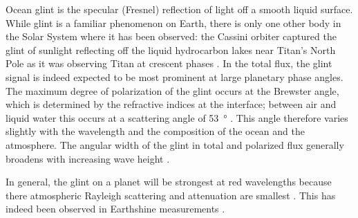 \documentclass[usenatbib]{mnras}
\begin{document}
Ocean glint is the specular (Fresnel) reflection of light off a smooth liquid surface. 
While glint is a familiar phenomenon on Earth, there is only one other body in the Solar System where it has been observed: the Cassini orbiter captured the glint of sunlight reflecting off the liquid hydrocarbon lakes near Titan's North Pole as it was observing %
Titan at crescent phases \citep{2010GeoRL..37.7104S}.
In the total flux, the glint signal is indeed expected to be most prominent at large planetary phase angles.
The maximum degree of polarization of the glint occurs at the Brewster angle, which is determined by the refractive indices at the interface; between air and liquid water this occurs at a scattering angle of \qty{53}{\degree} \citep[i.e., at a planetary phase angle of \qty{106}{\degree}; see, e.g.,][]
{Zugger_2010,treesandstam2019}.
This angle therefore varies slightly with the wavelength and the composition of the ocean and the atmosphere.
The angular width of the glint in total and polarized flux generally broadens with increasing wave height \citep{2008Icar..195..927W, kopparla2018, treesandstam2019, trees2022}.

In general, the glint on a planet will be strongest at red wavelengths because there atmospheric Rayleigh scattering and attenuation are smallest \citep{Zugger_2011}. This has indeed been observed in Earthshine measurements \citep{Emde2017,sterzik2019, takahashi2021}. %
%
%
\end{document}
